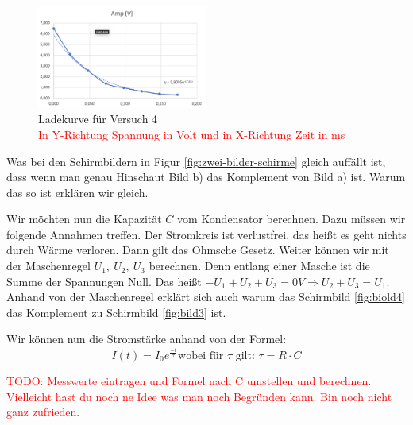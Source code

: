         \begin{figure}[h!]
            \centering
            \includegraphics[width=0.5\textwidth]{bilder/Physik_05.png}
            \caption{Ladekurve für Versuch 4 \\ \textcolor{red}{In Y-Richtung Spannung in Volt und in X-Richtung Zeit in ms}}
            \label{fig:versuch4}
        \end{figure}

       Was bei den Schirmbildern in Figur \ref{fig:zwei-bilder-schirme} gleich auffällt ist, dass wenn man genau Hinschaut Bild b) das Komplement von Bild a) ist. Warum das so ist erklären wir gleich. 
       
       Wir möchten nun die Kapazität $C$ vom Kondensator berechnen. Dazu müssen wir folgende Annahmen treffen. Der Stromkreis ist verlustfrei, das heißt es geht nichts durch Wärme verloren. Dann gilt das Ohmsche Gesetz. Weiter können wir mit der Maschenregel $U_1,\ U_2,\ U_3$ berechnen. Denn entlang einer Masche ist die Summe der Spannungen Null. Das heißt $-U_1 + U_2 + U_3 = 0V  \Rightarrow U_2 + U_3 = U_1$. Anhand von der Maschenregel erklärt sich auch warum das Schirmbild \ref{fig:biold4} das Komplement zu Schirmbild \ref{fig:bild3} ist.
       
       Wir können nun die Stromstärke anhand von der Formel:
       \begin{equation}
       	I(t)=I_0e^{\frac{-t}{\tau}} \text{wobei für $\tau$ gilt: } \tau = R \cdot C
       	\label{eq:kapazität}
       \end{equation}
       
       \textcolor{red}{TODO: Messwerte eintragen und Formel nach C umstellen und berechnen. Vielleicht hast du noch ne Idee was man noch Begründen kann. Bin noch nicht ganz zufrieden.}
       
       
       
       
